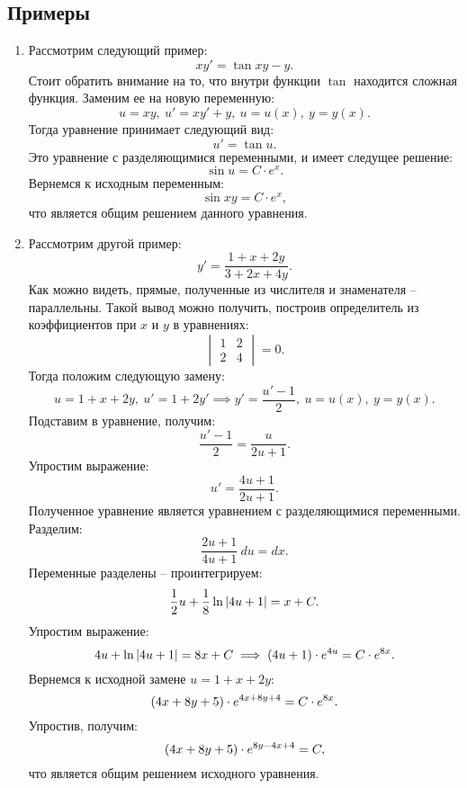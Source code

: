 	\subsection{Примеры}

		\begin{enumerate}
			\item Рассмотрим следующий пример:
				\[ xy' = \tan{xy} - y. \]
				Стоит обратить внимание на то, что внутри функции $\tan$ находится сложная функция. Заменим ее на новую переменную:
				\[ u = xy, ~ u' = xy' + y, ~ u = u(x), ~ y = y(x). \]
				Тогда уравнение принимает следующий вид:
				\[ u' = \tan{u}. \]
				Это уравнение с разделяющимися переменными, и имеет следущее решение:
				\[ \sin{u} = C \cdot e^{x}. \]
				Вернемся к исходным переменным:
				\[ \sin{xy} = C \cdot e^{x}, \]
				что является общим решением данного уравнения.

			\item Рассмотрим другой пример:
				\[ y' = \frac{1 + x + 2y}{3 + 2x + 4y}. \]
				Как можно видеть, прямые, полученные из числителя и знаменателя -- параллельны. Такой вывод можно получить, построив определитель из коэффициентов при $x$ и $y$ в уравнениях:
				\[ \begin{vmatrix} 1 & 2 \\ 2 & 4 \end{vmatrix} = 0. \]
				Тогда положим следующую замену:
				\[ u = 1 + x + 2y, ~ u' = 1 + 2y' \implies y' = \frac{u' - 1}{2}, ~ u = u(x), ~ y = y(x). \]
				Подставим в уравнение, получим:
				\[ \frac{u' - 1}{2} = \frac{u}{2u + 1}. \]
				Упростим выражение:
				\[ u' = \frac{4u + 1}{2u + 1}. \]
				Полученное уравнение является уравнением с разделяющимися переменными. Разделим:
				\[ \frac{2u + 1}{4u + 1} ~ du = dx. \]
				Переменные разделены -- проинтегрируем:
				\[ \frac{1}{2} u + \frac{1}{8} \ln \left\vert 4u + 1 \right\vert = x + C. \]
				Упростим выражение:
				\[ 4u + \ln\left\vert 4u + 1 \right\vert = 8x + C \implies \left( 4u + 1 \right) \cdot e^{4u} = C \cdot e^{8x}. \]
				Вернемся к исходной замене $u = 1 + x + 2y$:
				\[ \left( 4x + 8y + 5 \right) \cdot e^{4x + 8y + 4} = C \cdot e^{8x}. \]
				Упростив, получим:
				\[ \left( 4x + 8y + 5 \right) \cdot e^{8y - 4x + 4} = C, \]
				что является общим решением исходного уравнения.
			

\end{enumerate}
